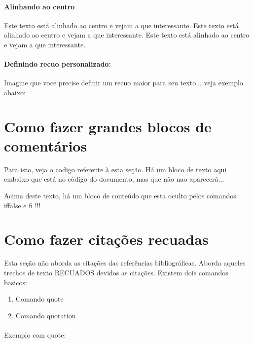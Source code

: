 \documentclass[12pt, a4paper]{article}
\begin{document}
\paragraph{Alinhando ao centro}
\begin{center}
Este texto está alinhado ao centro e vejam a que interessante. Este texto está alinhado ao centro e vejam a que interessante. Este texto está alinhado ao centro e vejam a que interessante. 
\end{center}

\paragraph{Definindo recuo personalizado:}
Imagine que voce precise definir um recuo maior para seu texto... veja exemplo abaixo:


\newpage
\section{Como fazer grandes blocos de comentários}

Para isto, veja o codigo referente à esta seção. Há um bloco de texto aqui embaixo que está no código do documento, mas que não nao aparecerá... \newline

%

Acima deste texto, há um bloco de conteúdo que esta oculto pelos comandos iffalse e fi !!!

\newpage
\section{Como fazer citações recuadas}

Esta seção não aborda as citações das referências bibliográficas. Aborda aqueles trechos de texto RECUADOS devidos as citações. Existem dois comandos basicos:

\begin{enumerate}
\item Comando quote
\item Comando quotation
\end{enumerate}

\paragraph{}
Exemplo com quote:
\end{document}
